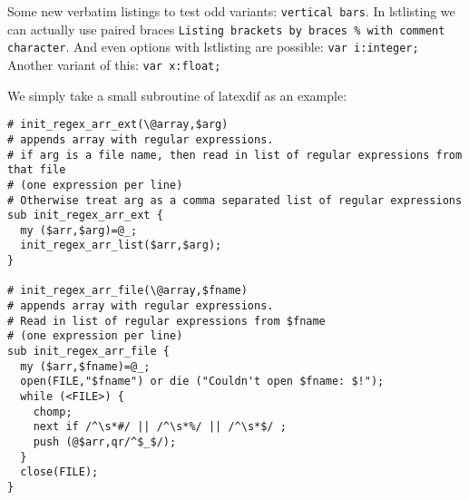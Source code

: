 \documentclass{article}
\begin{document}
Some new verbatim listings to test odd variants: \verb|vertical bars|.
In lstlisting we can actually use paired braces \lstinline{Listing brackets by braces % with comment character}.
And even options with lstlisting are possible: \lstinline[basicstyle=\footnotesize]{var i:integer;} 
Another variant of this: \lstinline[basicstyle=\footnotesize]$var x:float;$ 

We simply take a small subroutine of latexdif as an example:
\lstset{language=perl}
\begin{lstlisting}[commentstyle=\color{gray}]
# init_regex_arr_ext(\@array,$arg)
# appends array with regular expressions.
# if arg is a file name, then read in list of regular expressions from that file
# (one expression per line)
# Otherwise treat arg as a comma separated list of regular expressions
sub init_regex_arr_ext {
  my ($arr,$arg)=@_;
  init_regex_arr_list($arr,$arg);
}

# init_regex_arr_file(\@array,$fname)
# appends array with regular expressions.
# Read in list of regular expressions from $fname
# (one expression per line)
sub init_regex_arr_file {
  my ($arr,$fname)=@_;
  open(FILE,"$fname") or die ("Couldn't open $fname: $!");
  while (<FILE>) {
    chomp;
    next if /^\s*#/ || /^\s*%/ || /^\s*$/ ;
    push (@$arr,qr/^$_$/);
  }
  close(FILE);
}
\end{lstlisting}
\end{document}
